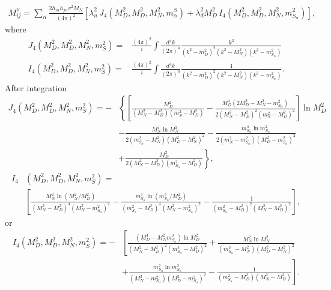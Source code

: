 \begin{align}
  M^{\nu}_{ij}=\sum_{\alpha}\frac{2h_{i\alpha}h_{j\alpha}v^2 M_N}{(4\pi)^2} 
      \left[\lambda_u^{2} \, J_4\left(M_D^2,M_D^2,M_N^2,m^{S}_{\alpha}  \right)
            + \lambda_d^2 M_D^2  \, I_4\left(M_D^2,M_D^2,M_N^2,m^2_{S_\alpha}  \right)
      \right],
\end{align}
where
\begin{align}
   J_4\left(M_D^2,M_D^2,M_N^2,m^2_{S}  \right)=&\frac{(4\pi)^2}{i}
   \int \frac{d^4 k}{(2\pi)^4}
\frac{k^2}{\left(k^2-m_D^2\right)^2\left( k^2-M_N^2 \right)\left(k^2-m_{S_\alpha}^2\right)} \nonumber\\
   I_4\left(M_D^2,M_D^2,M_N^2,m^2_{S}  \right)=&\frac{(4\pi)^2}{i}
   \int \frac{d^4 k}{(2\pi)^4}
\frac{1}{\left(k^2-m_D^2\right)^2\left( k^2-M_N^2 \right)\left(k^2-m_{S_\alpha}^2\right)}.
\end{align}
After integration
\begin{align*}
  J_4\left(M_D^2,M_D^2,M_N^2,m^2_{S}  \right)=
-&\left\{  \left[\frac{M_D^2}{\left(M_N^2-M_D^2\right)\left(m_{S}^2-M_D^2\right)} 
-\frac{M_D^4 \left(2M_D^2-M_N^2-m_{S_\alpha}^2\right)}{2\left(M_N^2-M_D^2\right)^2\left(m_{S}^2-M_D^2\right)^2} \right]\ln M_D^2\right.\nonumber\\
&-\frac{M_N^4\ln M_N^2}{2\left( m_{S_\alpha}^2-M_N^2 \right)\left( M_D^2-M_N^2 \right)^2}-
\frac{m_{S_\alpha}^4\ln m_{S_\alpha}^2}{2\left( m_N^2-m_{S_\alpha}^2 \right)\left( M_D^2-m_{S_\alpha}^2 \right)^2}
\nonumber\\
 &\left.+\frac{M_D^2}{2\left(M_N^2-M_D^2  \right)\left(m_{S_\alpha}^2-M_D^2  \right)} \right\},
\end{align*}
\begin{align}
      I_4&\left(M_D^2,M_D^2,M_N^2,m^2_{S}  \right)=\nonumber\\
&\left[\frac{M_N^2\ln \left( M_N^2/M_D^2 \right)}{\left( M_N^2-M_D^2 \right)^4\left( M_N^2-m_{S_\alpha}^2 \right)^2}
      -\frac{m_{S_\alpha}^2\ln \left( m_{S_\alpha}^2/M_D^2 \right)}{\left( m_{S_\alpha}^2-M_D^2 \right)^4\left( M_N^2-m_{S_\alpha}^2 \right)^2}-
      \frac{1}{\left(m_{S_\alpha}^2-M_D^2\right)^2\left(M_N^2 -M_D^2 \right)^2} 
 \right],
\end{align}
or
\begin{align}
   I_4\left(M_D^2,M_D^2,M_N^2,m^2_{S}  \right)=
-&\left[ \frac{\left(M_D^4-M_N^2 m_{S_\alpha}^2\right)\ln M_D^2}{\left(M_N^2 -M_D^2 \right)^2\left(m_{S_\alpha}^2 -M_D^2 \right)^2} 
+\frac{M_N^2 \ln M_N^2}{\left(m_{S_\alpha}^2 -M_N^2 \right)\left(M_D^2-M_N^2\right)^2}\right. \nonumber\\
&\left.+\frac{m_{S_\alpha}^2 \ln m_{S_\alpha}^2}{\left(M_N^2 -m_{S_\alpha}^2 \right)\left(M_D^2-m_{S_\alpha}^2\right)^2} 
-\frac{1}{\left(m_{S_\alpha}^2-M_D^2\right)\left(M_N^2 -M_D^2 \right)} 
\right].
\end{align}
